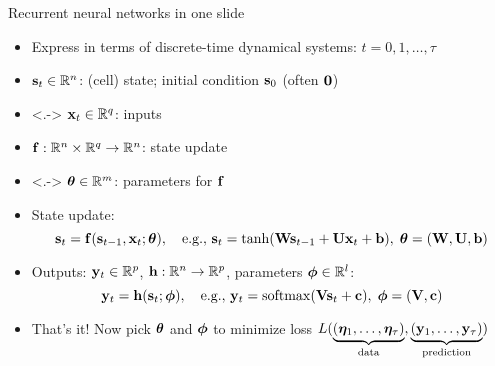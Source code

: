 \begin{frame}{Recurrent neural networks in one slide}
    \begin{itemize}[<+->]
        \item Express in terms of discrete-time dynamical systems: $t = 0, 1, \dots, \tau$
        \item $\mathbf{s}_t \in \mathbb{R}^n$: (cell) state; initial condition $\mathbf{s}_0$ (often $\mathbf{0}$)
        \item<.-> $\mathbf{x}_t \in \mathbb{R}^q$: inputs
        \item $\mathbf{f}: \mathbb{R}^n \times \mathbb{R}^q \to \mathbb{R}^n$: state update
        \item<.-> $\bm{\theta} \in \mathbb{R}^m$: parameters for $\mathbf{f}$
        \item State update:
        \begin{equation*}
            \mathbf{s}_t = \mathbf{f}(\mathbf{s}_{t-1}, \mathbf{x}_t; \bm{\theta}),
            \quad \text{e.g.}, \,
            \mathbf{s}_t = \tanh(\mathbf{W} \mathbf{s}_{t-1} + \mathbf{U} \mathbf{x}_t + \mathbf{b}), \;
            \bm{\theta} = (\mathbf{W}, \mathbf{U}, \mathbf{b})
        \end{equation*}
        \item Outputs: $\mathbf{y}_t \in \mathbb{R}^p$, $\mathbf{h}: \mathbb{R}^n \to \mathbb{R}^p$, parameters $\bm{\phi} \in \mathbb{R}^l$:
        \begin{equation*}
            \mathbf{y}_t = \mathbf{h}(\mathbf{s}_t; \bm{\phi}),
            \quad \text{e.g.}, \,
            \mathbf{y}_t = \mathrm{softmax}(\mathbf{V} \mathbf{s}_{t} + \mathbf{c}), \;
            \bm{\phi} = (\mathbf{V}, \mathbf{c})
        \end{equation*}
        \item That's it!  Now pick $\bm{\theta}$ and $\bm{\phi}$ to minimize loss $L(
            \underbrace{(\bm{\eta}_1, \dots, \bm{\eta}_\tau)}_\text{data},
            \underbrace{(\mathbf{y}_1, \dots, \mathbf{y}_\tau)}_\text{prediction}
        )$
    \end{itemize}
\end{frame}

